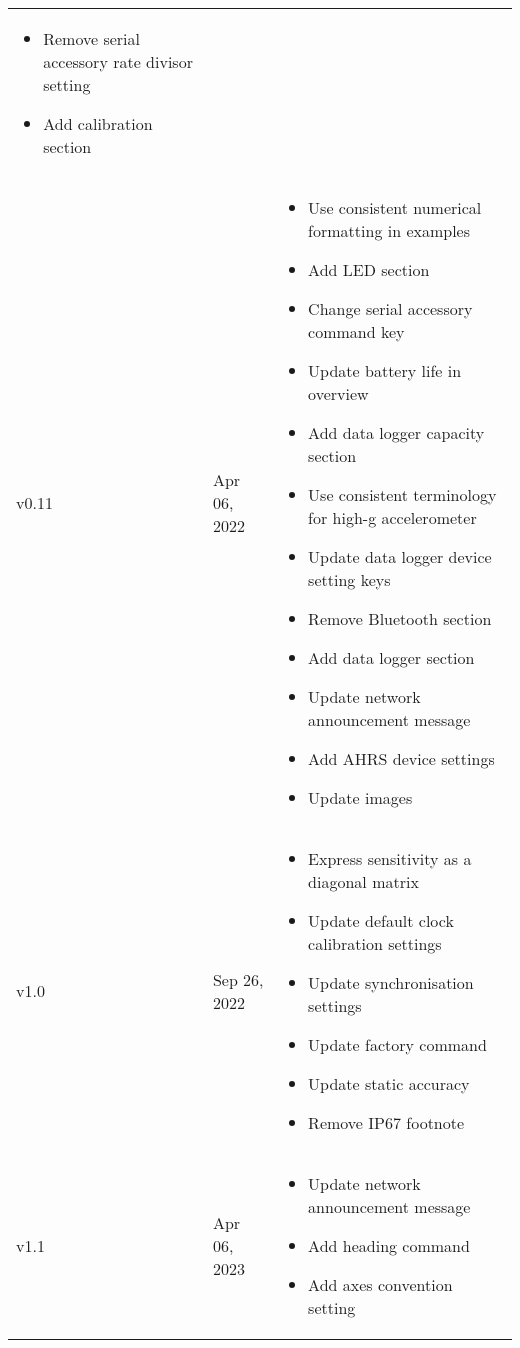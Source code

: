 \begin{longtable}{| >{\centering}p{} | p{} | >{\raggedright\arraybackslash}p{} |}
\begin{itemize}
            \item Remove serial accessory rate divisor setting
            \item Add calibration section
        \end{itemize}\\
        v0.11 & Apr 06, 2022 &
        \begin{itemize}
            \item Use consistent numerical formatting in examples
            \item Add \ac{LED} section
            \item Change serial accessory command key
            \item Update battery life in overview
            \item Add data logger capacity section
            \item Use consistent terminology for high-g accelerometer
            \item Update data logger device setting keys
            \item Remove Bluetooth section
            \item Add data logger section
            \item Update network announcement message
            \item Add AHRS device settings
            \item Update images
        \end{itemize}\\
        v1.0 & Sep 26, 2022 &
        \begin{itemize}
            \item Express sensitivity as a diagonal matrix
            \item Update default clock calibration settings
            \item Update synchronisation settings
            \item Update factory command
            \item Update static accuracy
            \item Remove IP67 footnote
        \end{itemize}\\
        v1.1 & Apr 06, 2023 &
        \begin{itemize}
            \item Update network announcement message
            \item Add heading command
            \item Add axes convention setting

\end{itemize}
\end{longtable}
